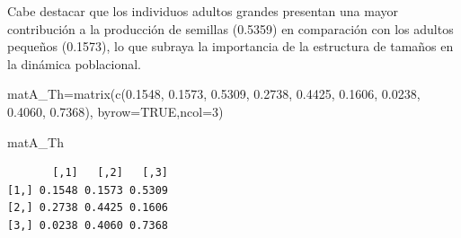 \documentclass[
  12pt,
  letterpaper,
]{book}
\newenvironment{Shaded}{\begin{snugshade}}{\end{snugshade}}
\newcommand{\AttributeTok}[1]{\textcolor[rgb]{0.40,0.45,0.13}{#1}}
\newcommand{\ConstantTok}[1]{\textcolor[rgb]{0.56,0.35,0.01}{#1}}
\newcommand{\DecValTok}[1]{\textcolor[rgb]{0.68,0.00,0.00}{#1}}
\newcommand{\FloatTok}[1]{\textcolor[rgb]{0.68,0.00,0.00}{#1}}
\newcommand{\FunctionTok}[1]{\textcolor[rgb]{0.28,0.35,0.67}{#1}}
\newcommand{\NormalTok}[1]{\textcolor[rgb]{0.00,0.23,0.31}{#1}}
\newcommand{\OtherTok}[1]{\textcolor[rgb]{0.00,0.23,0.31}{#1}}
\begin{document}
Cabe destacar que los individuos adultos grandes presentan una mayor
contribución a la producción de semillas (0.5359) en comparación con los
adultos pequeños (0.1573), lo que subraya la importancia de la
estructura de tamaños en la dinámica poblacional.

\begin{Shaded}
\begin{Highlighting}[]
\NormalTok{matA\_Th}\OtherTok{=}\FunctionTok{matrix}\NormalTok{(}\FunctionTok{c}\NormalTok{(}\FloatTok{0.1548}\NormalTok{, }\FloatTok{0.1573}\NormalTok{, }\FloatTok{0.5309}\NormalTok{,}
                 \FloatTok{0.2738}\NormalTok{, }\FloatTok{0.4425}\NormalTok{, }\FloatTok{0.1606}\NormalTok{,}
                 \FloatTok{0.0238}\NormalTok{, }\FloatTok{0.4060}\NormalTok{, }\FloatTok{0.7368}\NormalTok{), }\AttributeTok{byrow=}\ConstantTok{TRUE}\NormalTok{,}\AttributeTok{ncol=}\DecValTok{3}\NormalTok{)}

\NormalTok{matA\_Th}
\end{Highlighting}
\end{Shaded}

\begin{verbatim}
       [,1]   [,2]   [,3]
[1,] 0.1548 0.1573 0.5309
[2,] 0.2738 0.4425 0.1606
[3,] 0.0238 0.4060 0.7368
\end{verbatim}
\end{document}
